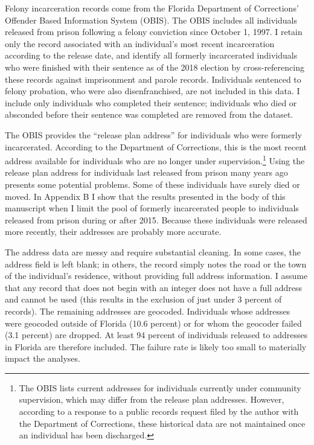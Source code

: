 \documentclass[
  12pt,
]{article}
\begin{document}
Felony incarceration records come from the Florida Department of Corrections' Offender Based Information System (OBIS). The OBIS includes all individuals released from prison following a felony conviction since October 1, 1997. I retain only the record associated with an individual's most recent incarceration according to the release date, and identify all formerly incarcerated individuals who were finished with their sentence as of the 2018 election by cross-referencing these records against imprisonment and parole records. Individuals sentenced to felony probation, who were also disenfranchised, are not included in this data. I include only individuals who completed their sentence; individuals who died or absconded before their sentence was completed are removed from the dataset.

The OBIS provides the ``release plan address'' for individuals who were formerly incarcerated. According to the Department of Corrections, this is the most recent address available for individuals who are no longer under supervision.\footnote{The OBIS lists current addresses for individuals currently under community supervision, which may differ from the release plan addresses. However, according to a response to a public records request filed by the author with the Department of Corrections, these historical data are not maintained once an individual has been discharged.} Using the release plan address for individuals last released from prison many years ago presents some potential problems. Some of these individuals have surely died or moved. In Appendix B I show that the results presented in the body of this manuscript when I limit the pool of formerly incarcerated people to individuals released from prison during or after 2015. Because these individuals were released more recently, their addresses are probably more accurate.

The address data are messy and require substantial cleaning. In some cases, the address field is left blank; in others, the record simply notes the road or the town of the individual's residence, without providing full address information. I assume that any record that does not begin with an integer does not have a full address and cannot be used (this results in the exclusion of just under 3 percent of records). The remaining addresses are geocoded. Individuals whose addresses were geocoded outside of Florida (10.6 percent) or for whom the geocoder failed (3.1 percent) are dropped. At least 94 percent of individuals released to addresses in Florida are therefore included. The failure rate is likely too small to materially impact the analyses.
\end{document}

